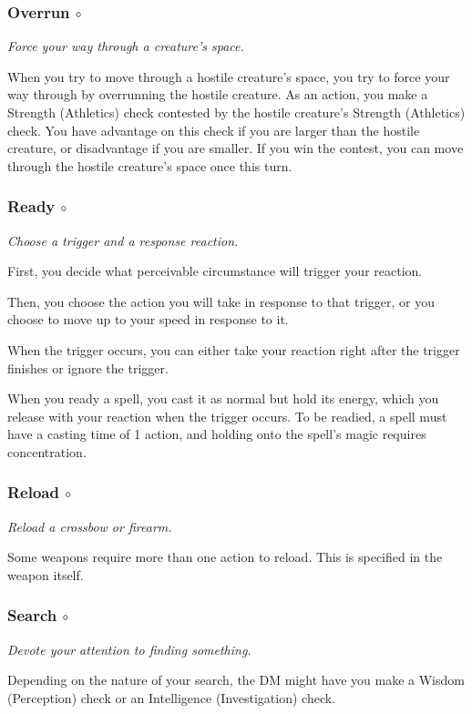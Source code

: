\subsubsection{Overrun $\circ$}
    \textit{Force your way through a creature's space.}

    When you try to move through a hostile creature's space, you try to force your way through by overrunning the hostile creature.
    As an action, you make a Strength (Athletics) check contested by the hostile creature's Strength (Athletics) check.
    You have advantage on this check if you are larger than the hostile creature, or disadvantage if you are smaller.
    If you win the contest, you can move through the hostile creature's space once this turn.

\subsubsection{Ready $\circ$}
    \textit{Choose a trigger and a response reaction.}

    First, you decide what perceivable circumstance will trigger your reaction.

    Then, you choose the action you will take in response to that trigger, or you choose to move up to your speed in response to it.

    When the trigger occurs, you can either take your reaction right after the trigger finishes or ignore the trigger.

    When you ready a spell, you cast it as normal but hold its energy, which you release with your reaction when the trigger occurs.
    To be readied, a spell must have a casting time of 1 action, and holding onto the spell's magic requires concentration.

\subsubsection{Reload $\circ$}
    \textit{Reload a crossbow or firearm.}

    Some weapons require more than one action to reload.
    This is specified in the weapon itself.

\subsubsection{Search $\circ$}
    \textit{Devote your attention to finding something.}

    Depending on the nature of your search, the DM might have you make a Wisdom (Perception) check or an Intelligence (Investigation) check.

